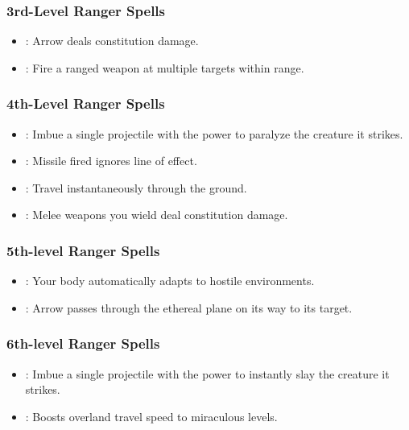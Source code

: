 \subsubsection{3rd-Level Ranger Spells}
\begin{itemize}
 \item {}: Arrow deals constitution damage.
 \item {}: Fire a ranged weapon at multiple targets within range.
\end{itemize}
\subsubsection{4th-Level Ranger Spells}
\begin{itemize}
 \item {}: Imbue a single projectile with the power to paralyze the creature it strikes.
 \item {}: Missile fired ignores line of effect.
 \item {}: Travel instantaneously through the ground.
 \item {}: Melee weapons you wield deal constitution damage.
\end{itemize}

\subsubsection{5th-level Ranger Spells}
\begin{itemize}
 \item {}: Your body automatically adapts to hostile environments.
 \item {}: Arrow passes through the ethereal plane on its way to its target.
\end{itemize}

\subsubsection{6th-level Ranger Spells}
\begin{itemize}
\item {}: Imbue a single projectile with the power to instantly slay the creature it strikes.
\item {}: Boosts overland travel speed to miraculous levels.
\end{itemize}

